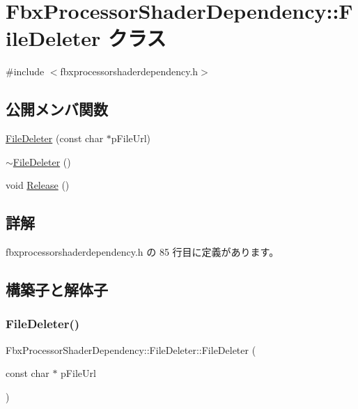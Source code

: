 \hypertarget{class_fbx_processor_shader_dependency_1_1_file_deleter}{}\section{Fbx\+Processor\+Shader\+Dependency\+:\+:File\+Deleter クラス}
\label{class_fbx_processor_shader_dependency_1_1_file_deleter}


{\ttfamily \#include $<$fbxprocessorshaderdependency.\+h$>$}

\subsection*{公開メンバ関数}
\begin{DoxyCompactItemize}
\item 
\hyperlink{class_fbx_processor_shader_dependency_1_1_file_deleter_af698d2ae1b5328fe6d4d236d3b1fdeea}{File\+Deleter} (const char $\ast$p\+File\+Url)
\item 
\hyperlink{class_fbx_processor_shader_dependency_1_1_file_deleter_a16ff5637056bea8b0b96234f874fcba5}{$\sim$\+File\+Deleter} ()
\item 
void \hyperlink{class_fbx_processor_shader_dependency_1_1_file_deleter_a23e8e0bc187b5625de18a905c2c2b75c}{Release} ()
\end{DoxyCompactItemize}


\subsection{詳解}


 fbxprocessorshaderdependency.\+h の 85 行目に定義があります。



\subsection{構築子と解体子}
\mbox{\label{class_fbx_processor_shader_dependency_1_1_file_deleter_af698d2ae1b5328fe6d4d236d3b1fdeea}} 
\subsubsection{\texorpdfstring{File\+Deleter()}{FileDeleter()}}
{\footnotesize\ttfamily Fbx\+Processor\+Shader\+Dependency\+::\+File\+Deleter\+::\+File\+Deleter (\begin{DoxyParamCaption}\item[{const char $\ast$}]{p\+File\+Url }\end{DoxyParamCaption})\hspace{0.3cm}{\ttfamily [inline]}}



